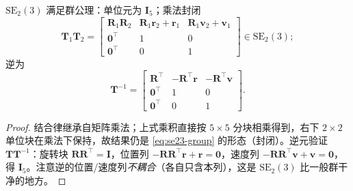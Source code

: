 \begin{proposition}\label{prop:se23-group}
$\mathrm{SE}_2(3)$ 满足群公理：单位元为 $\mathbf{I}_5$；乘法封闭
\[
  \mathbf{T}_1\mathbf{T}_2=\begin{bmatrix}\mathbf{R}_1\mathbf{R}_2&\mathbf{R}_1\mathbf{r}_2+\mathbf{r}_1&\mathbf{R}_1\mathbf{v}_2+\mathbf{v}_1\\\mathbf{0}^\top&1&0\\\mathbf{0}^\top&0&1\end{bmatrix}\in\mathrm{SE}_2(3);
\]
逆为
\begin{equation}
  \mathbf{T}^{-1}=\begin{bmatrix}\mathbf{R}^\top&-\mathbf{R}^\top\mathbf{r}&-\mathbf{R}^\top\mathbf{v}\\\mathbf{0}^\top&1&0\\\mathbf{0}^\top&0&1\end{bmatrix}.
  \label{eq:se23-inverse}
\end{equation}
\end{proposition}
\begin{proof}
结合律继承自矩阵乘法；上式乘积直接按 $5\times5$ 分块相乘得到，右下 $2\times2$ 单位块在乘法下保持，故结果仍是 \cref{eq:se23-group} 的形态（封闭）。逆元验证 $\mathbf{T}\mathbf{T}^{-1}$：旋转块 $\mathbf{R}\mathbf{R}^\top=\mathbf{I}$，位置列 $-\mathbf{R}\mathbf{R}^\top\mathbf{r}+\mathbf{r}=\mathbf{0}$，速度列 $-\mathbf{R}\mathbf{R}^\top\mathbf{v}+\mathbf{v}=\mathbf{0}$，得 $\mathbf{I}_5$。注意逆的位置/速度列\emph{不耦合}（各自只含本列），这是 $\mathrm{SE}_2(3)$ 比一般群干净的地方。
\end{proof}

